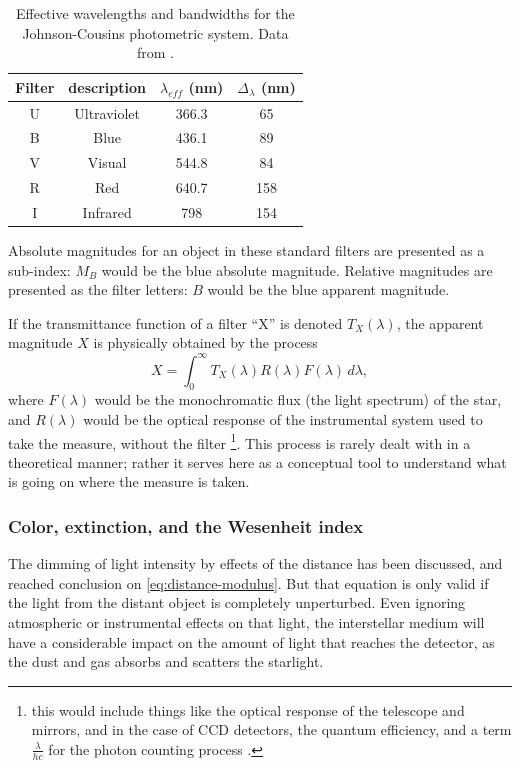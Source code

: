 	\begin{table}
		\centering
		\begin{tabular}{c|c||c|c}
			Filter & description & $\lambda_{eff}$ (nm) & $\Delta_{\lambda}$ (nm) \\ \hline\hline
			U & Ultraviolet & 366.3 & 65 \\ 
			B & Blue & 436.1 & 89 \\ 
			V & Visual & 544.8 & 84 \\ 
			R & Red & 640.7 & 158 \\ 
			I & Infrared & 798 & 154
		\end{tabular}
		\caption[Johnson-Cousins effective wavelengths and bandwidths]{
			Effective wavelengths and bandwidths for the Johnson-Cousins photometric system. Data from \cite{Bessell2005}.
			}
		\label{tab:filters}
	\end{table}
	
	Absolute magnitudes for an object in these standard filters are presented as a sub-index: $M_B$ would be the blue absolute magnitude.
	Relative magnitudes are presented as the filter letters: $B$ would be the blue apparent magnitude.
	
	If the transmittance function of a filter \enquote{X} is denoted $T_X(\lambda)$, the apparent magnitude $X$ is physically obtained by the process
	\begin{equation}
		X = \int_0^\infty T_X(\lambda) R(\lambda) F(\lambda) \,d\lambda,
	\end{equation}
	where $F(\lambda)$ would be the monochromatic flux (the light spectrum) of the star, 
	and $R(\lambda)$ would be the optical response of the instrumental system used to take the measure, without the filter
	\footnote{this would include things like the optical response of the telescope and mirrors, 
	and in the case of CCD detectors, the quantum efficiency, and a term $\frac{\lambda}{hc}$ for the photon counting process \citep{Bessell2005}.}.
	This process is rarely dealt with in a theoretical manner; 
	rather it serves here as a conceptual tool to understand what is going on where the measure is taken.
	
	\subsubsection{Color, extinction, and the Wesenheit index}
	
	The dimming of light intensity by effects of the distance has been discussed, and reached conclusion on \autoref{eq:distance-modulus}.
	But that equation is only valid if the light from the distant object is completely unperturbed.
	Even ignoring atmospheric or instrumental effects on that light, 
	the interstellar medium will have a considerable impact on the amount of light that reaches the detector,
	as the dust and gas absorbs and scatters the starlight. 
	

